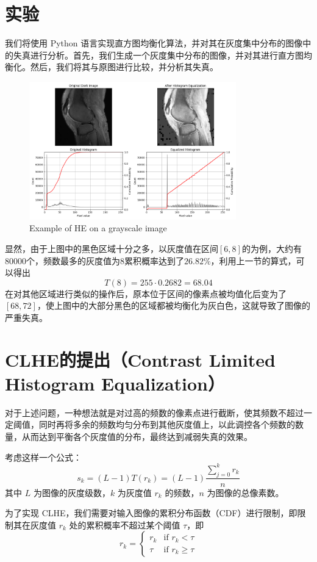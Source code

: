 \documentclass{ctexart}
\begin{document}
\section{实验}
   我们将使用 Python 语言实现直方图均衡化算法，并对其在灰度集中分布的图像中的失真进行分析。首先，我们生成一个灰度集中分布的图像，并对其进行直方图均衡化。然后，我们将其与原图进行比较，并分析其失真。
\begin{figure}[http]
        \centering
      
    \includegraphics[width=0.8\textwidth]{Figure_1.png}
       \caption{Example of HE on a grayscale image}
    \end{figure}
   
显然，由于上图中的黑色区域十分之多，以灰度值在区间$[6,8]$的为例，大约有$80000$个，频数最多的灰度值为$8$累积概率达到了$26.82\%$，利用上一节的算式，可以得出\[T(8)=255\cdot 0.2682=68.04\]
在对其他区域进行类似的操作后，原本位于区间的像素点被均值化后变为了$[68,72]$，使上图中的大部分黑色的区域都被均衡化为灰白色，这就导致了图像的严重失真。
\newpage
\section{CLHE的提出（Contrast Limited Histogram Equalization）}
对于上述问题，一种想法就是对过高的频数的像素点进行截断，使其频数不超过一定阈值，同时再将多余的频数均匀分布到其他灰度值上，以此调控各个频数的数量，从而达到平衡各个灰度值的分布，最终达到减弱失真的效果。

考虑这样一个公式：
\begin{equation}
s_k = (L-1)T(r_k)=(L-1)\frac{\sum_{j=0}^{k}r_k}{n}
\end{equation}
其中 $L$ 为图像的灰度级数，$k$ 为灰度值 $r_k$ 的频数，$n$ 为图像的总像素数。

为了实现 CLHE，我们需要对输入图像的累积分布函数（CDF）进行限制，即限制其在灰度值 $r_k$ 处的累积概率不超过某个阈值 $\tau$，即
\begin{equation}
r_k = \begin{cases}
r_k & \text{if } r_k < \tau \\  
\tau & \text{if } r_k \geq \tau
\end{cases}
\end{equation}
\end{document}
